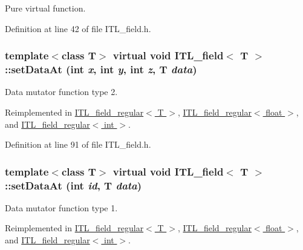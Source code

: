 Pure virtual function. 



Definition at line 42 of file ITL\_\-field.h.

\hypertarget{classITL__field_aeea532e25732eb1582a937409a98d05e}{
\subsubsection[{setDataAt}]{\setlength{\rightskip}{0pt plus 5cm}template$<$class T$>$ virtual void {\bf ITL\_\-field}$<$ T $>$::setDataAt (int {\em x}, \/  int {\em y}, \/  int {\em z}, \/  T {\em data})}}
\label{classITL__field_aeea532e25732eb1582a937409a98d05e}


Data mutator function type 2. 



Reimplemented in \hyperlink{classITL__field__regular_a38fef3e9ec1551e58d217dcb29bcbc4b}{ITL\_\-field\_\-regular$<$ T $>$}, \hyperlink{classITL__field__regular_a38fef3e9ec1551e58d217dcb29bcbc4b}{ITL\_\-field\_\-regular$<$ float $>$}, and \hyperlink{classITL__field__regular_a38fef3e9ec1551e58d217dcb29bcbc4b}{ITL\_\-field\_\-regular$<$ int $>$}.



Definition at line 91 of file ITL\_\-field.h.

\hypertarget{classITL__field_ae87ee8fef9c9b9dc6a782ccbfe3605e1}{
\subsubsection[{setDataAt}]{\setlength{\rightskip}{0pt plus 5cm}template$<$class T$>$ virtual void {\bf ITL\_\-field}$<$ T $>$::setDataAt (int {\em id}, \/  T {\em data})}}
\label{classITL__field_ae87ee8fef9c9b9dc6a782ccbfe3605e1}


Data mutator function type 1. 



Reimplemented in \hyperlink{classITL__field__regular_a201a4f3e6b1a0ff6654f2bfbb40f516d}{ITL\_\-field\_\-regular$<$ T $>$}, \hyperlink{classITL__field__regular_a201a4f3e6b1a0ff6654f2bfbb40f516d}{ITL\_\-field\_\-regular$<$ float $>$}, and \hyperlink{classITL__field__regular_a201a4f3e6b1a0ff6654f2bfbb40f516d}{ITL\_\-field\_\-regular$<$ int $>$}.



